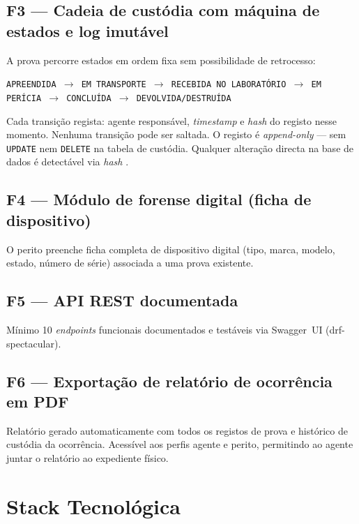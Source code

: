 \documentclass[a4paper,11pt]{article}
\begin{document}
\subsection{F3 — Cadeia de custódia com máquina de estados e log imutável}

A prova percorre estados em ordem fixa sem possibilidade de retrocesso:

\begin{center}
\small
\texttt{APREENDIDA $\rightarrow$ EM TRANSPORTE $\rightarrow$ RECEBIDA NO LABORATÓRIO $\rightarrow$ EM PERÍCIA $\rightarrow$ CONCLUÍDA $\rightarrow$ DEVOLVIDA/DESTRUÍDA}
\end{center}

Cada transição regista: agente responsável, \emph{timestamp} e \emph{hash} do
registo nesse momento. Nenhuma transição pode ser saltada. O registo é
\emph{append-only} — sem \texttt{UPDATE} nem \texttt{DELETE} na tabela de
custódia. Qualquer alteração directa na base de dados é detectável via
\emph{hash} \citep{casey2011,acpo2012}.

\subsection{F4 — Módulo de forense digital (ficha de dispositivo)}

O perito preenche ficha completa de dispositivo digital (tipo, marca, modelo,
estado, número de série) associada a uma prova existente.

\subsection{F5 — API REST documentada}

Mínimo 10 \emph{endpoints} funcionais documentados e testáveis via Swagger~UI
(drf-spectacular).

\subsection{F6 — Exportação de relatório de ocorrência em PDF}

Relatório gerado automaticamente com todos os registos de prova e histórico de
custódia da ocorrência. Acessível aos perfis agente e perito, permitindo ao
agente juntar o relatório ao expediente físico.

\section{Stack Tecnológica}
\end{document}

